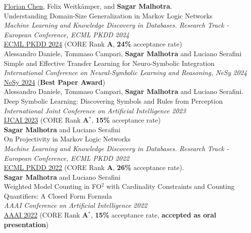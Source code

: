 \documentclass[10pt, a4paper]{article}
\newcommand{\years}[1]{\marginnote{\scriptsize #1}}
\begin{document}
\years{2024}\underline{Florian Chen}, Felix Weitkämper, and \textbf{Sagar Malhotra}.\\
Understanding Domain-Size Generalization in Markov Logic Networks\\
\emph{Machine Learning and Knowledge Discovery in Databases. Research Track - European Conference, ECML PKDD 2024} \\
\href{https://arxiv.org/abs/2403.15933}{ECML PKDD 2024} (CORE Rank \textbf{A}, \textbf{24\%} acceptance rate)\\

\years{2024}Alessandro Daniele, Tommaso Campari, \textbf{Sagar Malhotra} and Luciano Serafini\\
Simple and Effective Transfer Learning for Neuro-Symbolic Integration\\
\emph{International Conference on Neural-Symbolic Learning and Reasoning, NeSy 2024}\\
\href{https://arxiv.org/abs/2402.14047}{NeSy 2024} (\textbf{Best Paper Award})\\ 

\years{2023}Alessandro Daniele, Tommaso Campari, \textbf{Sagar Malhotra} and Luciano Serafini. \\ Deep Symbolic Learning: Discovering Symbols and Rules from Perception \\ 
\emph{International Joint Conference on Artificial Intelligence 2023}\\
\href{https://www.ijcai.org/proceedings/2023/400}{IJCAI 2023} (CORE Rank \textbf{A$^{*}$}, \textbf{15\%} acceptance rate)\\ 


\years{2022}\textbf{Sagar Malhotra} and Luciano Serafini\\
 On Projectivity in Markov Logic Networks \\ \emph{Machine Learning and Knowledge Discovery in Databases. Research Track - European Conference, ECML PKDD 2022} \\  
\href{https://link.springer.com/chapter/10.1007/978-3-031-26419-1_14}{ECML PKDD 2022} (CORE Rank \textbf{A}, \textbf{26\%} acceptance rate).\\ 


\years{2022}\textbf{Sagar Malhotra} and Luciano Serafini\\ 
Weighted Model Counting in FO$^2$ with Cardinality Constraints and Counting Quantifiers: A Closed Form Formula \\ \emph{AAAI Conference on Artificial Intelligence 2022}\\
\href{https://ojs.aaai.org/index.php/AAAI/article/view/20525}{AAAI 2022} (CORE Rank \textbf{A$^{*}$}, \textbf{15\%} acceptance rate, \textbf{accepted as oral presentation}) \\
\end{document}

